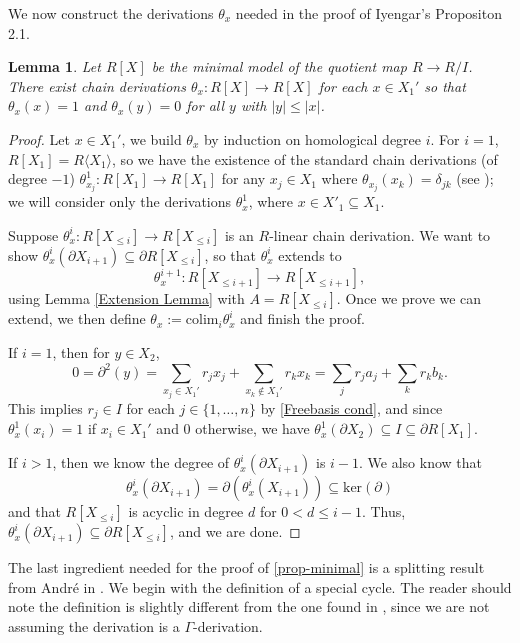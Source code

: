\documentclass{amsart}
\newtheorem{lem}[theorem]{Lemma}
\theoremstyle{definition}
\theoremstyle{remark}
\begin{document}
We now construct the derivations $\theta_x$ needed in the proof of Iyengar's Propositon 2.1. 
 \begin{lem}\label{extn lemma2}
     Let $R[X]$ be the minimal model of the quotient map $R \to R/I$. There exist chain derivations $\theta_x: R[X] \to R[X]$ for each $x \in X_1'$ so that $\theta_x(x)=1$ and $\theta_x(y) = 0$ for all $y$ with $|y|\leq|x|$.
  \end{lem}

\begin{proof}
   Let $x \in X_1'$, we build $\theta_{x}$ by induction on homological degree $i$. For $i =1$, $R[X_1]=R\langle X_1 \rangle$, so we have the existence of the standard chain derivations (of degree $-1$) $\theta^1_{x_j}: R[X_1] \to R[X_1]$ for any $x_j \in X_1$ where $\theta_{x_j}(x_k)=\delta_{jk}$ (see \cite{AvramovIFR}); we will consider only the derivations $\theta^1_{x}$, where $x \in X'_1 \subseteq X_1$.

  Suppose $\theta_{x}^{i}: R[X_{\leq i}] \to R[X_{\leq i}]$ is an $R$-linear chain derivation. We want to show $\theta^{i}_{x}(\partial X_{i+1}) \subseteq \partial R[X_{\leq i}]$, so that $\theta^{i}_{x}$ extends to \[\theta^{i+1}_{x}: R[X_{\leq i+1}] \to R[X_{\leq i+1}],\] using Lemma \ref{Extension Lemma} with $A= R[X_{\leq i}]$. Once we prove we can extend, we then define $\theta_{x} := \text{colim}_{i} \theta_{x}^{i}$ and finish the proof.

  If $i=1$, then for $y \in X_2$,
  \[
  0= \partial^2(y) = \sum_{x_j\in X_1'} r_jx_j + \sum_{x_k \notin X_1'} r_kx_k = \sum_j r_ja_j + \sum_k r_kb_k.
  \]
  This implies $r_j \in I$ for each $j \in \{1, \ldots, n\}$ by \ref{Freebasis cond}, and since $\theta_x^1(x_i)=1$ if $x_i \in X_1'$ and $0$ otherwise, we have $\theta_{x}^{1}(\partial X_2) \subseteq I \subseteq \partial R[X_1]$.
  
  If $i >1 $, then we know the degree of $\theta_{x}^{i}(\partial X_{i+1})$ is $ i-1$. We also know that \[\theta^{i}_{x}(\partial X_{i+1}) = \partial\left(\theta^{i}_{x}( X_{i+1}) \right) \subseteq \text{ker}(\partial)\]
  and that $R[X_{\leq i }]$ is acyclic in degree $d$ for $0< d \leq i-1$. Thus, $\theta^{i}_{x}(\partial X_{i+1}) \subseteq \partial R[X_{\leq i}]$, and we are done.
\end{proof}

 The last ingredient needed for the proof of \cref{prop-minimal} is a splitting result from André in \cite{André1982}. We begin with the definition of a special cycle. The reader should note the definition is slightly different from the one found in \cite{André1982}, since we are not assuming the derivation is a $\Gamma$-derivation.
\end{document}
